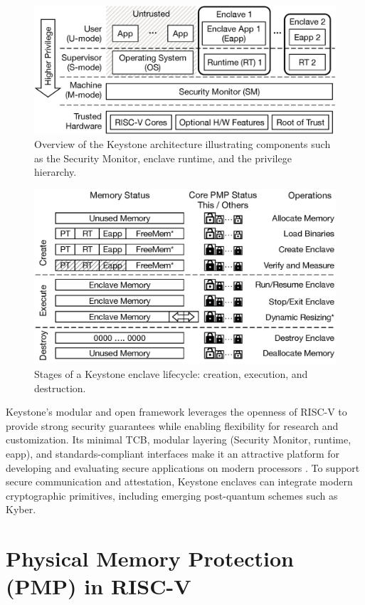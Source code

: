 \begin{figure}[htbp]
\centering
\includegraphics[width=0.9\linewidth]{figures/keystone_overview.png}
\caption{Overview of the Keystone architecture illustrating components such as the Security Monitor, enclave runtime, and the privilege hierarchy.}
\label{fig:keystone_overview}
\end{figure}

\begin{figure}[htbp]
\centering
\includegraphics[width=0.9\linewidth]{figures/enclave_lifecycle.png}
\caption{Stages of a Keystone enclave lifecycle: creation, execution, and destruction.}
\label{fig:enclave_lifecycle}
\end{figure}

Keystone’s modular and open framework leverages the openness of RISC-V to provide strong security guarantees while enabling flexibility for research and customization. Its minimal TCB, modular layering (Security Monitor, runtime, eapp), and standards-compliant interfaces make it an attractive platform for developing and evaluating secure applications on modern processors \cite{dayeol2019keystone}. 
To support secure communication and attestation, Keystone enclaves can integrate modern cryptographic primitives, including emerging post-quantum schemes such as Kyber.

\section{Physical Memory Protection (PMP) in RISC-V}
\label{sec:pmp}

